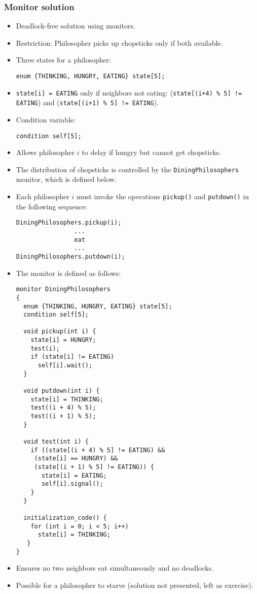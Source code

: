 \begin{itemize}
    \subsubsection{Monitor solution}
    \begin{itemize}
        \item Deadlock-free solution using monitors.
        \item Restriction: Philosopher picks up chopsticks only if both available.
        \item Three states for a philosopher:
        \begin{verbatim}
enum {THINKING, HUNGRY, EATING} state[5];
\end{verbatim}
        \item \texttt{state[i] = EATING} only if neighbors not eating: (\texttt{state[(i+4) \% 5] != EATING}) and (\texttt{state[(i+1) \% 5] != EATING}).
        \item Condition variable:
        \begin{verbatim}
condition self[5];
\end{verbatim}
        \item Allows philosopher $i$ to delay if hungry but cannot get chopsticks.
        \item The distribution of chopsticks is controlled by the \texttt{DiningPhilosophers} monitor, which is defined below.
        \item Each philosopher $i$ must invoke the operations \texttt{pickup()} and \texttt{putdown()} in the following sequence:
        \begin{verbatim}
DiningPhilosophers.pickup(i);
                ...
                eat
                ...
DiningPhilosophers.putdown(i);
\end{verbatim}
        \item The monitor is defined as follows:
        \begin{verbatim}
monitor DiningPhilosophers
{
  enum {THINKING, HUNGRY, EATING} state[5];
  condition self[5];
 
  void pickup(int i) {
    state[i] = HUNGRY;
    test(i);
    if (state[i] != EATING)
      self[i].wait();
  }
 
  void putdown(int i) {
    state[i] = THINKING;
    test((i + 4) % 5);
    test((i + 1) % 5);
  }
 
  void test(int i) {
    if ((state[(i + 4) % 5] != EATING) &&
     (state[i] == HUNGRY) &&
     (state[(i + 1) % 5] != EATING)) {
       state[i] = EATING;
       self[i].signal();
    }
  }
 
  initialization_code() {
    for (int i = 0; i < 5; i++)
      state[i] = THINKING;
   }
}
        \end{verbatim}
        \item Ensures no two neighbors eat simultaneously and no deadlocks.
        \item Possible for a philosopher to starve (solution not presented, left as exercise).
    \end{itemize}
\end{itemize}

